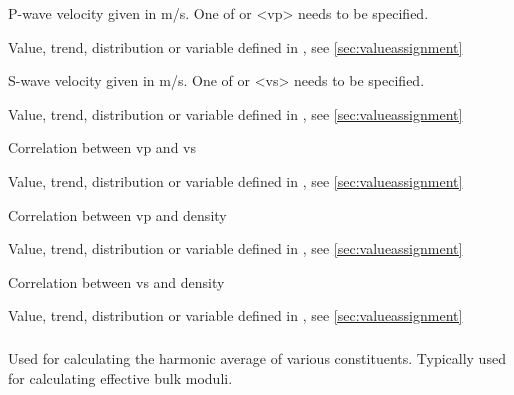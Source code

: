 {
 \slist
   \item \Description P-wave velocity given in m/s. One of  or <vp> needs to be specified.
   \item \Argument Value, trend, distribution or variable defined in , see \autoref{sec:valueassignment}
   \item \Default 
 \elist

 \slist
   \item \Description S-wave velocity given in m/s. One of  or <vs> needs to be specified.
   \item \Argument Value, trend, distribution or variable defined in , see \autoref{sec:valueassignment}
   \item \Default 
 \elist

 \slist
   \item \Description Correlation between vp and vs
   \item \Argument Value, trend, distribution or variable defined in , see \autoref{sec:valueassignment}
   \item {}
 \elist

 \slist
   \item \Description Correlation between vp and density
   \item \Argument Value, trend, distribution or variable defined in , see \autoref{sec:valueassignment}
   \item {}
 \elist

 \slist
   \item \Description Correlation between vs and density
   \item \Argument Value, trend, distribution or variable defined in , see \autoref{sec:valueassignment}
   \item {}
 \elist

\subparagraph{}
 \slist
   \item \Description Used for calculating the harmonic average of various constituents. Typically used for calculating effective bulk moduli. 
   \item \Argument
   \item \Default 
 \elist

}
